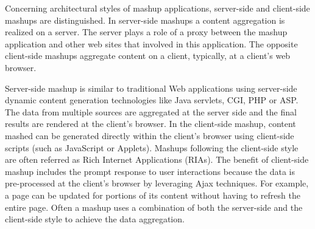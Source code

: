		Concerning architectural styles of mashup applications, server-side and client-side mashups are distinguished. In server-side mashups a content aggregation is realized on a server\cite{mashA}. The server plays a role of a proxy between the mashup application and other web sites that involved in this application. The opposite client-side mashups aggregate content on a client, typically, at a client's web browser\cite{mashB}.

	 Server-side mashup is similar to traditional Web applications using server-side dynamic content generation technologies like Java servlets, CGI, PHP or ASP. The data from multiple sources are aggregated at the server side and the final results are rendered at the client’s browser. In the client-side mashup, content mashed can be generated directly within the client’s browser using client-side scripts (such as JavaScript or Applets). Mashups following the client-side style are often referred as Rich Internet Applications (RIAs). The benefit of client-side mashup includes the prompt response to user interactions because the data is pre-processed at the client’s browser by leveraging Ajax techniques. For example, a page can be updated for portions of its content without having to refresh the entire page. Often a mashup uses a combination of both the server-side and the client-side style to achieve the data aggregation\cite{bolin2005end}.

